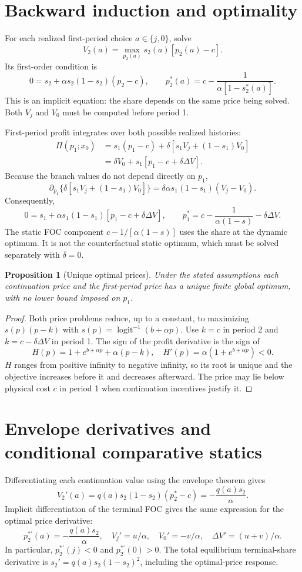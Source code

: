 \documentclass[11pt]{article}
\newtheorem{proposition}{Proposition}
\begin{document}
\section{Backward induction and optimality}
For each realized first-period choice $a\in\{j,0\}$, solve
\[
 V_2(a)=\max_{p_2(a)}s_2(a)[p_2(a)-c].
\]
Its first-order condition is
\[
 0=s_2+\alpha s_2(1-s_2)(p_2-c),\qquad
 p_2^*(a)=c-\frac1{\alpha[1-s_2^*(a)]}.
\]
This is an implicit equation: the share depends on the same price being solved.
Both $V_j$ and $V_0$ must be computed before period 1.

First-period profit integrates over both possible realized histories:
\begin{align*}
 \Pi(p_1;x_0)&=s_1(p_1-c)+\delta[s_1V_j+(1-s_1)V_0]\\
 &=\delta V_0+s_1[p_1-c+\delta\Delta V].
\end{align*}
Because the branch values do not depend directly on $p_1$,
\[
 \partial_{p_1}\{\delta[s_1V_j+(1-s_1)V_0]\}
 =\delta\alpha s_1(1-s_1)(V_j-V_0).
\]
Consequently,
\[
 0=s_1+\alpha s_1(1-s_1)[p_1-c+\delta\Delta V],\qquad
 p_1^*=c-\frac1{\alpha(1-s)}-\delta\Delta V.
\]
The static FOC component $c-1/[\alpha(1-s)]$ uses the share at the dynamic
optimum. It is not the counterfactual static optimum, which must be solved
separately with $\delta=0$.

\begin{proposition}[Unique optimal prices]
Under the stated assumptions each continuation price and the first-period price
has a unique finite global optimum, with no lower bound imposed on $p_1$.
\end{proposition}
\begin{proof}
Both price problems reduce, up to a constant, to maximizing
$s(p)(p-k)$ with $s(p)=\operatorname{logit}^{-1}(b+\alpha p)$.
Use $k=c$ in period 2 and $k=c-\delta\Delta V$ in period 1.
The sign of the profit derivative is the sign of
\[
 H(p)=1+e^{b+\alpha p}+\alpha(p-k),\quad
 H'(p)=\alpha(1+e^{b+\alpha p})<0.
\]
$H$ ranges from positive infinity to negative infinity, so its root is unique
and the objective increases before it and decreases afterward. The price may
lie below physical cost $c$ in period 1 when continuation incentives justify it.
\end{proof}

\section{Envelope derivatives and conditional comparative statics}
Differentiating each continuation value using the envelope theorem gives
\[
 V_2'(a)=q(a)s_2(1-s_2)(p_2^*-c)=-\frac{q(a)s_2}{\alpha}.
\]
Implicit differentiation of the terminal FOC gives the same expression for the
optimal price derivative:
\[
 p_2^{*\prime}(a)=-\frac{q(a)s_2}{\alpha},\quad
 V_j'=u/\alpha,\quad V_0'=-v/\alpha,\quad
 \Delta V'=(u+v)/\alpha.
\]
In particular, $p_2^{*\prime}(j)<0$ and $p_2^{*\prime}(0)>0$.
The total equilibrium terminal-share derivative is
$s_2'=q(a)s_2(1-s_2)^2$, including the optimal-price response.
\end{document}
